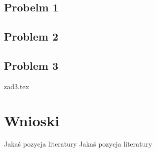 \documentclass[twoside]{pracaInzynierskaMS}
\begin{document}
\subsection     {Probelm 1}


\newpage
\subsection     {Problem 2}


\newpage
\subsection     {Problem 3}
 {zad3.tex}

\section        {Wnioski}

   
\begin{thebibliography}{2}

 Jakaś pozycja literatury
 Jakaś pozycja literatury

\end{thebibliography}
\end{document}
